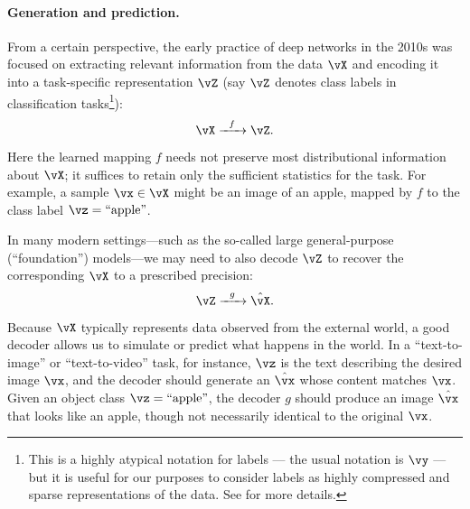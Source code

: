 \documentclass[../../book-main.tex]{subfiles}
\begin{document}
\paragraph{Generation and prediction.}
From a certain perspective, the early practice of deep networks in
the 2010s was focused on extracting relevant information from the
data \(\vX\) and encoding it into a task-specific representation
\(\vZ\) (say \(\vZ\) denotes class labels in classification
    tasks\footnote{This is a highly atypical notation for labels --- the
        usual notation is \(\vy\) --- but it is useful for our purposes to
        consider labels as highly compressed and sparse representations of
        the data. See 
for more details.}):
\begin{equation}
    \vX   \xrightarrow{\hspace{2mm} f \hspace{2mm}} \vZ.
    \label{eqn:encoding-deep-networks}
\end{equation}
Here the learned mapping \(f\) needs not preserve most distributional
information about \(\vX\); it suffices to retain only the sufficient
statistics for the task. For example, a sample \(\vx \in \vX\) might
be an image of an apple, mapped by \(f\) to the class label \(\vz =
\text{``apple''}\).

In many modern settings---such as the so-called large general-purpose
(``foundation'') models---we may need to also decode \(\vZ\) to
recover the corresponding \(\vX\) to a prescribed precision:
\begin{equation}
    \vZ   \xrightarrow{\hspace{2mm} g  \hspace{2mm}} \hat{\vX}.
    \label{eqn:decoding-deep-networks}
\end{equation}
Because \(\vX\) typically represents data observed from the external
world, a good decoder allows us to simulate or predict what happens
in the world. In a ``text-to-image'' or ``text-to-video'' task, for
instance, \(\vz\) is the text describing the desired image \(\vx\),
and the decoder should generate an \(\hat{\vx}\) whose content
matches \(\vx\). Given an object class \(\vz = \text{``apple''}\),
the decoder \(g\) should produce an image \(\hat{\vx}\) that looks
like an apple, though not necessarily identical to the original \(\vx\).
\end{document}

